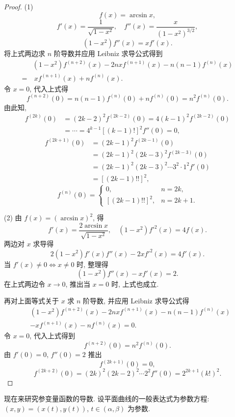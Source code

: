 \begin{proof}
(1)
\[
f(x) = \arcsin x,
\]
\[
f'(x) = \frac{1}{\sqrt{1-x^{2}}},\quad f''(x) = \frac{x}{(1-x^{2})^{3/2}},
\]
\[
(1-x^{2})f''(x) = xf'(x).
\]
将上式两边求 $n$ 阶导数并应用 Leibniz 求导公式得到
\[
\begin{aligned}
&(1-x^{2})f^{(n+2)}(x) - 2nxf^{(n+1)}(x) - n(n-1)f^{(n)}(x)\\
=&\ xf^{(n+1)}(x) + nf^{(n)}(x).
\end{aligned}
\]
令 $x = 0$, 代入上式得
\[
f^{(n+2)}(0) = n(n-1)f^{(n)}(0) + nf^{(n)}(0) = n^{2}f^{(n)}(0).
\]
由此知,
\[
\begin{aligned}
f^{(2k)}(0) &= (2k-2)^{2}f^{(2k-2)}(0) = 4(k-1)^{2}f^{(2k-2)}(0)\\
&= \cdots = 4^{k-1}[(k-1)!]^{2}f''(0) = 0,
\end{aligned}
\]
\[
\begin{aligned}
f^{(2k+1)}(0) &= (2k-1)^{2}f^{(2k-1)}(0)\\
&= (2k-1)^{2}(2k-3)^{2}f^{(2k-3)}(0)\\
&= (2k-1)^{2}(2k-3)^{2}\cdots3^{2}\cdot1^{2}f'(0)\\
&= [(2k-1)!!]^{2},
\end{aligned}
\]
\[
f^{(n)}(0) = \begin{cases}0, & n = 2k,\\ [(2k-1)!!]^{2}, & n = 2k+1.\end{cases}
\]

(2) 由 $f(x) = (\arcsin x)^{2}$, 得
\[
f'(x) = \frac{2\arcsin x}{\sqrt{1-x^{2}}},\quad (1-x^{2})f'^{2}(x) = 4f(x).
\]
两边对 $x$ 求导得
\[
2(1-x^{2})f'(x)f''(x) - 2xf'^{2}(x) = 4f'(x).
\]
当 $f'(x) \neq 0 \iff x \neq 0$ 时, 整理得
\[
(1-x^{2})f''(x) - xf'(x) = 2.
\]
在上式两边令 $x \to 0$, 推出当 $x = 0$ 时, 上式也成立.

再对上面等式关于 $x$ 求 $n$ 阶导数, 并应用 Leibniz 求导公式得
\[
\begin{aligned}
&(1-x^{2})f^{(n+2)}(x) - 2nxf^{(n+1)}(x) - n(n-1)f^{(n)}(x)\\
&- xf^{(n+1)}(x) - nf^{(n)}(x) = 0.
\end{aligned}
\]
令 $x = 0$, 代入上式得到
\[
f^{(n+2)}(0) = n^{2}f^{(n)}(0).
\]
由 $f'(0) = 0$, $f''(0) = 2$ 推出
\[
f^{(2k+1)}(0) = 0,
\]
\[
f^{(2k+2)}(0) = (2k)^{2}(2k-2)^{2}\cdots2^{2}f''(0) = 2^{2k+1}(k!)^{2}.
\]
\end{proof}

现在来研究参变量函数的导数. 设平面曲线的一般表达式为参数方程: $(x, y) = (x(t), y(t))$, $t \in (\alpha, \beta)$ 为参数.

